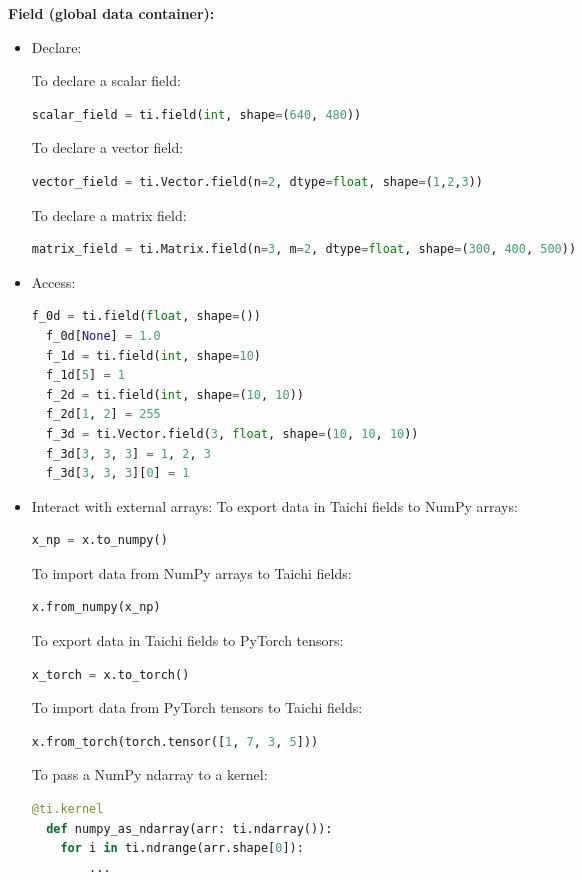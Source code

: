 \documentclass[10pt,landscape,a4paper]{article}
\newenvironment{myboxed}[1]
{\begin{mdframed}[linecolor=black,
                  backgroundcolor=white,
                  outerlinewidth=0.25pt,
                  innertopmargin=1ex,
                  topline=true,
                  rightline=true,
                  leftline=true,
                  bottomline=true,
                  linecolor=black!0,
                  frametitleaboveskip=0.5em,
                  frametitlebelowskip=0.5em,
                  innerbottommargin=.5\baselineskip,
                  innerrightmargin=.5em,
                  innerleftmargin=.5em,
                  frametitle={\footnotesize \RobotoSlab \bfseries \hspace*{0mm} #1},
                  frametitlebackgroundcolor=black!5,
                  frametitlerulewidth=2pt]}
{\end{mdframed}}
\begin{document}
\begin{multicols*}{5}
\begin{myboxed}{Data Container}
  \textbf{Field (global data container):}

  \begin{itemize}
  \item Declare:

  To declare a scalar field:
  \begin{lstlisting}[language=Python]
  scalar_field = ti.field(int, shape=(640, 480))
  \end{lstlisting}
  To declare a vector field:
  \begin{lstlisting}[language=Python]
  vector_field = ti.Vector.field(n=2, dtype=float, shape=(1,2,3))
  \end{lstlisting}
  To declare a matrix field:
  \begin{lstlisting}[language=Python]
  matrix_field = ti.Matrix.field(n=3, m=2, dtype=float, shape=(300, 400, 500))
  \end{lstlisting}

  \item Access:
  \begin{lstlisting}[language=Python]
  f_0d = ti.field(float, shape=())
  f_0d[None] = 1.0
  f_1d = ti.field(int, shape=10)
  f_1d[5] = 1
  f_2d = ti.field(int, shape=(10, 10))
  f_2d[1, 2] = 255
  f_3d = ti.Vector.field(3, float, shape=(10, 10, 10))
  f_3d[3, 3, 3] = 1, 2, 3
  f_3d[3, 3, 3][0] = 1
  \end{lstlisting}

  \item Interact with external arrays:
  To export data in Taichi fields to NumPy arrays:
  \begin{lstlisting}[language=Python]
  x_np = x.to_numpy()
  \end{lstlisting}
  To import data from NumPy arrays to Taichi fields:
  \begin{lstlisting}[language=Python]
  x.from_numpy(x_np)
  \end{lstlisting}
  To export data in Taichi fields to PyTorch tensors:
  \begin{lstlisting}[language=Python]
  x_torch = x.to_torch()
  \end{lstlisting}
  To import data from PyTorch tensors to Taichi fields:
  \begin{lstlisting}[language=Python]
  x.from_torch(torch.tensor([1, 7, 3, 5]))
  \end{lstlisting}
  To pass a NumPy ndarray to a kernel:
  \begin{lstlisting}[language=Python]
  @ti.kernel
  def numpy_as_ndarray(arr: ti.ndarray()):
    for i in ti.ndrange(arr.shape[0]):
        ...
  \end{lstlisting}


\end{itemize}
\end{myboxed}
\end{multicols*}
\end{document}
